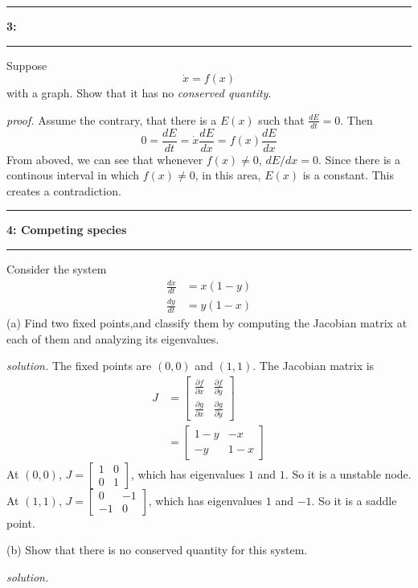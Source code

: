 \documentclass[11pt]{article}
\newcommand\question[2]{\vspace{.25in}\hrule\textbf{#1: #2}\vspace{.5em}\hrule\vspace{.10in}}
\begin{document}
\question{3}{}

Suppose \[\dot{x} = f(x)\] with a graph. Show that it has no \textit{conserved quantity}.

\textit{proof.}
Assume the contrary, that there is a $E(x)$ such that $\frac{dE}{dt} = 0$.
Then
\[0=\frac{dE}{dt} = \dot{x}\frac{dE}{dx}=f(x)\frac{dE}{dx}\]
From aboved, we can see that whenever $f(x)\neq 0$, $dE/dx = 0$. Since there is a continous interval in which $f(x)\neq 0$, in this area, $E(x)$ is a constant. This creates a contradiction.

\question{4}{Competing species}
Consider the system
\begin{align*}
  \frac{dx}{dt} &= x(1-y) \\
  \frac{dy}{dt} &= y(1-x)
\end{align*}
(a) Find two fixed points,and classify them by computing the Jacobian matrix at each of them and analyzing its eigenvalues.

\textit{solution.}
The fixed points are $(0,0)$ and $(1,1)$. The Jacobian matrix is
\begin{align*}
  J &= \begin{bmatrix}\frac{\partial f}{\partial x} &\frac{\partial f}{\partial y} \\ \frac{\partial g}{\partial x} &\frac{\partial g}{\partial y} \end{bmatrix} \\
    &= \begin{bmatrix}1-y &-x \\ -y &1-x \end{bmatrix}
\end{align*}
At $(0,0)$, $J = \begin{bmatrix}1 &0 \\ 0 &1 \end{bmatrix}$, which has eigenvalues $1$ and $1$. So it is a unstable node.
At $(1,1)$, $J = \begin{bmatrix}0 &-1 \\ -1 &0 \end{bmatrix}$, which has eigenvalues $1$ and $-1$. So it is a saddle point.

(b) Show that there is no conserved quantity for this system.

\textit{solution.}
\end{document}

